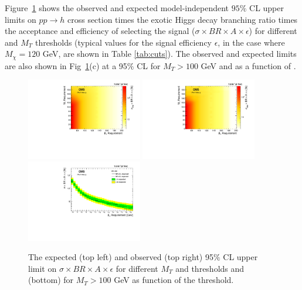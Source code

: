   Figure~\ref{fig:limit_MI} shows the observed and expected model-independent $95\%$ CL upper limits on $pp\rightarrow h$ cross section times the exotic Higgs decay branching ratio times the acceptance and efficiency of selecting the signal ($\sigma\times BR\times A\times\epsilon$) for different \met and $M_{T}$ thresholds (typical values for the signal efficiency $\epsilon$, in the case where $M_{\chi} = 120$ GeV, are shown in Table \ref{tab:cuts}). The observed and expected limits are also shown in Fig~\ref{fig:limit_MI}(c) at a 95$\%$ CL for $M_{T}> 100$ GeV and as a function of \met.


\begin{figure}[H]        
\centering                
{\includegraphics[width=0.45\textwidth]{PAS_Plots/pretty/2d_expected.pdf}}
{\includegraphics[width=0.45\textwidth]{PAS_Plots/pretty/2d_observed.pdf}} \\
{\includegraphics[width=0.45\textwidth]{PAS_Plots/LimitPlotVsMET_MT100.pdf}}
\caption{ The expected (top left) and observed (top right) 95$\%$ CL upper limit on $\sigma \times BR\times A\times\epsilon$ for different $M_{T}$ and \met thresholds and (bottom) for $M_{T}> 100$ GeV as function of the \met threshold.}
\label{fig:limit_MI}      
\end{figure}    


